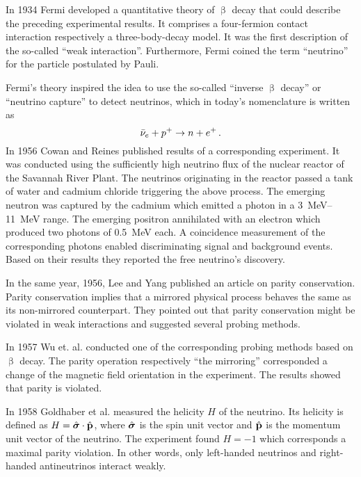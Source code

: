     In 1934 Fermi developed a quantitative theory of $\upbeta$ decay that could describe the preceding experimental results. It comprises a four-fermion contact interaction respectively a three-body-decay model. It was the first description of the so-called ``weak interaction''. Furthermore, Fermi coined the term ``neutrino'' for the particle postulated by Pauli. \cite{Fermi1934}
    
    Fermi's theory inspired the idea to use the so-called ``inverse $\upbeta$ decay'' or ``neutrino capture'' to detect neutrinos, which in today's nomenclature is written as
    \begin{equation*}
        \bar{\nu}_{e} + p^+ \rightarrow n + e^+ \text{\,.}
    \end{equation*}
    In 1956 Cowan and Reines published results of a corresponding experiment. It was conducted using the sufficiently high neutrino flux of the nuclear reactor of the Savannah River Plant. The neutrinos originating in the reactor passed a tank of water and cadmium chloride triggering the above process. The emerging neutron was captured by the cadmium which emitted a photon in a \SIrange{3}{11}{MeV} range. The emerging positron annihilated with an electron which produced two photons of \SI{0.5}{MeV} each. A coincidence measurement of the corresponding photons enabled discriminating signal and background events. Based on their results they reported the free neutrino's discovery. \cite{Cowan103}
    
    In the same year, 1956, Lee and Yang published an article on parity conservation. Parity conservation implies that a mirrored physical process behaves the same as its non-mirrored counterpart. They pointed out that parity conservation might be violated in weak interactions and suggested several probing methods. \cite{Lee1956}
    
    In 1957 Wu et. al. conducted one of the corresponding probing methods based on $\upbeta$ decay. The parity operation respectively ``the mirroring'' corresponded a change of the magnetic field orientation in the experiment. The results showed that parity is violated. \cite{Wu1957}
    
    In 1958 Goldhaber et al. measured the helicity $H$ of the neutrino. Its helicity is defined as $ H = \hat{\boldsymbol{\mathbf{\sigma}}} \cdot \hat{\boldsymbol{\mathbf{p}}}$, where $\hat{\boldsymbol{\mathbf{\sigma}}}$ is the spin unit vector and $\hat{\boldsymbol{\mathbf{p}}}$ is the momentum unit vector of the neutrino. The experiment found $H = -1$ which corresponds a maximal parity violation. In other words, only left-handed neutrinos and right-handed antineutrinos interact weakly.~\cite{Goldhaber1958}
    
